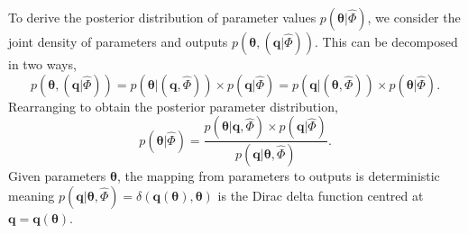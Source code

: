 To derive the posterior distribution of parameter values $p(\boldsymbol{\theta}|\hat{\Phi})$, we consider the joint density of parameters and outputs $p(\boldsymbol{\theta},(\boldsymbol{q}|\hat{\Phi}))$. This can be decomposed in two ways,
%
\begin{equation}\label{eq:joint}
  p( \boldsymbol{\theta}, (\boldsymbol{q}|\hat{\Phi}) )
= p( \boldsymbol{\theta}|(\boldsymbol{q}, \hat{\Phi}) ) \times p(\boldsymbol{q}|\hat{\Phi})
= p( \boldsymbol{q}|(\boldsymbol{\theta}, \hat{\Phi}) ) \times p(\boldsymbol{\theta}|\hat{\Phi}).
\end{equation}
%
Rearranging to obtain the posterior parameter distribution,
%
\begin{equation}
p(\boldsymbol{\theta}|\hat{\Phi})
= \frac{p(\boldsymbol{\theta}|\boldsymbol{q}, \hat{\Phi}) \times p(\boldsymbol{q}|\hat{\Phi})}{p(\boldsymbol{q}| \boldsymbol{\theta}, \hat{\Phi})}.
\end{equation}
%
Given parameters $\boldsymbol{\theta}$, the mapping from parameters to outputs is deterministic meaning
$p(\boldsymbol{q}| \boldsymbol{\theta}, \hat{\Phi})=\delta(\boldsymbol{q}(\boldsymbol{\theta}),\boldsymbol{\theta})$ is the Dirac delta function centred at $\boldsymbol{q}=\boldsymbol{q}(\boldsymbol{\theta})$.


